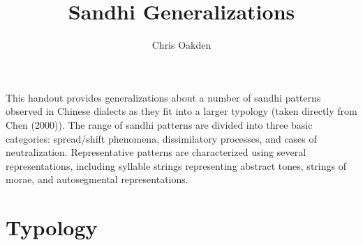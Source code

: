 \documentclass{article}
\title{Sandhi Generalizations}
\author{Chris Oakden}
\begin{document}
\maketitle

This handout provides generalizations about a number of sandhi patterns observed in Chinese dialects as they fit into a larger typology (taken directly from Chen (2000)). The range of sandhi patterns are divided into three basic categories: spread/shift phenomena, dissimilatory processes, and cases of neutralization. Representative patterns are characterized using several representations, including syllable strings representing abstract tones, strings of morae, and autosegmental representations.
\section{Typology}
\end{document}

